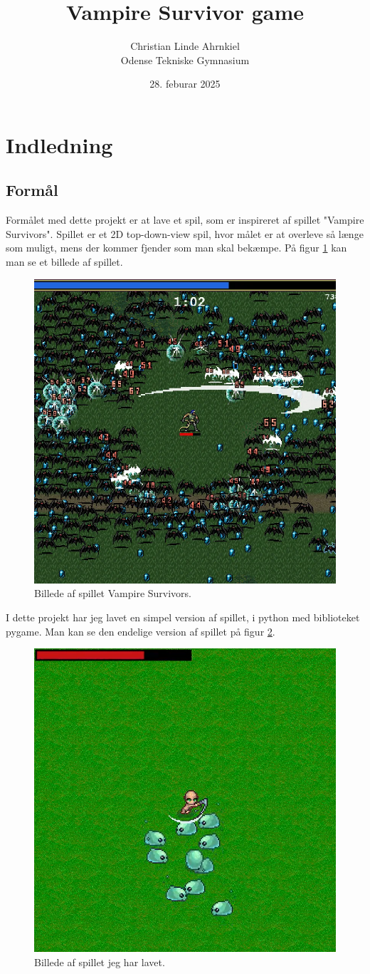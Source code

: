 \documentclass{article}
\title{Vampire Survivor game}
\author{Christian Linde Ahrnkiel\\
Odense Tekniske Gymnasium
}
\date{28. feburar 2025}
\begin{document}
\maketitle
\tableofcontents

\section{Indledning}
    \subsection{Formål}
    Formålet med dette projekt er at lave et spil, som er inspireret af spillet "Vampire Survivors". 
    Spillet er et 2D top-down-view spil, hvor målet er at overleve så længe som muligt, 
    mens der kommer fjender som man skal bekæmpe. På figur \ref{fig:vps} kan man se et billede af spillet.

    \begin{figure}[h]
    \centering
    \includegraphics[width=0.5\linewidth]{vps.png}
    \caption{\label{fig:vps}Billede af spillet Vampire Survivors.}
    \end{figure}

    I dette projekt har jeg lavet en simpel version af spillet, i python med biblioteket pygame.
    Man kan se den endelige version af spillet på figur \ref{fig:game}.

    \begin{figure}[h]
    \centering
    \includegraphics[width=0.5\linewidth]{game.png}
    \caption{\label{fig:game}Billede af spillet jeg har lavet.}
    \end{figure}
\end{document}

